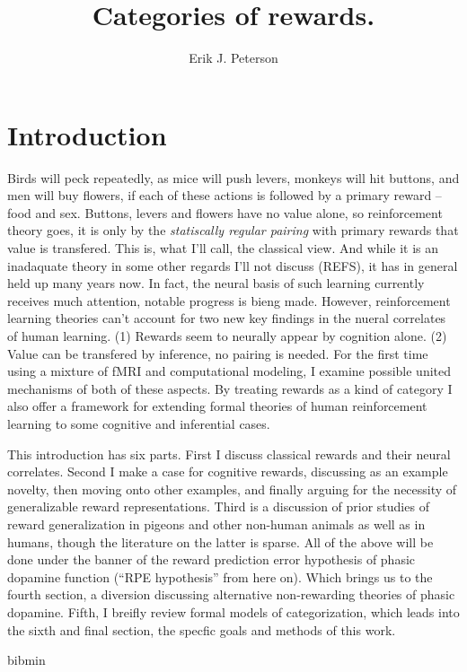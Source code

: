 \documentclass[doc,12pt]{apa}        %
\title{Categories of rewards.}
\author{Erik J. Peterson} \affiliation{Dept. of Psychology \\ Colorado State University \\ Fort Collins, CO}
\begin{document}
 
\maketitle
\doublespacing

\section{Introduction} %
\label{sec:introduction}
Birds will peck repeatedly, as mice will push levers, monkeys will hit buttons, and men will buy flowers, if each of these actions is followed by a primary reward -- food and sex.  Buttons, levers and flowers have no value alone, so reinforcement theory goes, it is only by the \emph{statiscally regular pairing} with primary rewards that value is transfered.  This is, what I'll call, the classical view.  And while it is an inadaquate theory in some other regards I'll not discuss (REFS), it has in general held up many years now.  In fact, the neural basis of such learning currently receives much attention, notable progress is bieng made.  However, reinforcement learning theories can't account for two new key findings in the nueral correlates of human learning. (1) Rewards seem to neurally appear by cognition alone. (2) Value can be transfered by inference, no pairing is needed.  For the first time using a mixture of fMRI and computational modeling, I examine possible united mechanisms of both of these aspects. By treating rewards as a kind of category I also offer a framework for extending formal theories of human reinforcement learning to some cognitive and inferential cases.

This introduction has six parts.  First I discuss classical rewards and their neural correlates.  Second I make a case for cognitive rewards, discussing as an example novelty, then moving onto other examples, and finally arguing for the necessity of generalizable reward representations.  Third is a discussion of prior studies of reward generalization in pigeons and other non-human animals as well as in humans, though the literature on the latter is sparse.   All of the above will be done under the banner of the reward prediction error hypothesis of phasic dopamine function (``RPE hypothesis'' from here on).  Which brings us to the fourth section, a diversion discussing alternative non-rewarding theories of phasic dopamine.  Fifth, I breifly review formal models of categorization, which leads into the sixth and final section, the specfic goals and methods of this work.

\newpage
 {bibmin}

\end{document}
